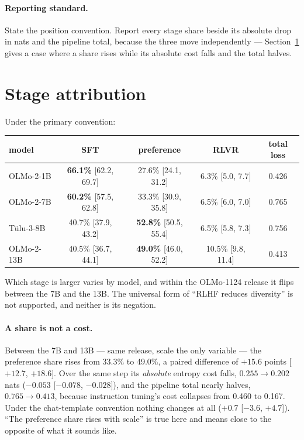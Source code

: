 \documentclass[11pt]{article}
\begin{document}
\paragraph{Reporting standard.} State the position convention. Report every stage
share beside its absolute drop in nats and the pipeline total, because the three
move independently --- Section~\ref{sec:stages} gives a case where a share rises
while its absolute cost falls and the total halves.

\section{Stage attribution}
\label{sec:stages}

Under the primary convention:

\begin{center}
\begin{tabular}{lcccc}
\toprule
model & SFT & preference & RLVR & total loss \\
\midrule
OLMo-2-1B & \textbf{66.1\%} [62.2, 69.7] & 27.6\% [24.1, 31.2] & 6.3\% [5.0, 7.7] & 0.426 \\
OLMo-2-7B & \textbf{60.2\%} [57.5, 62.8] & 33.3\% [30.9, 35.8] & 6.5\% [6.0, 7.0] & 0.765 \\
T\"ulu-3-8B & 40.7\% [37.9, 43.2] & \textbf{52.8\%} [50.5, 55.4] & 6.5\% [5.8, 7.3] & 0.756 \\
OLMo-2-13B & 40.5\% [36.7, 44.1] & \textbf{49.0\%} [46.0, 52.2] & 10.5\% [9.8, 11.4] & 0.413 \\
\bottomrule
\end{tabular}
\end{center}

Which stage is larger varies by model, and within the OLMo-1124 release it flips
between the 7B and the 13B. The universal form of ``RLHF reduces diversity'' is not
supported, and neither is its negation.

\paragraph{A share is not a cost.} Between the 7B and 13B --- same release, scale
the only variable --- the preference share rises from 33.3\% to 49.0\%, a paired
difference of $+15.6$ points [$+12.7$, $+18.6$]. Over the same step its
\emph{absolute} entropy cost falls, $0.255 \to 0.202$ nats ($-0.053$
[$-0.078$, $-0.028$]), and the pipeline total nearly halves, $0.765 \to 0.413$,
because instruction tuning's cost collapses from 0.460 to 0.167. Under the
chat-template convention nothing changes at all ($+0.7$ [$-3.6$, $+4.7$]). ``The
preference share rises with scale'' is true here and means close to the opposite of
what it sounds like.
\end{document}

